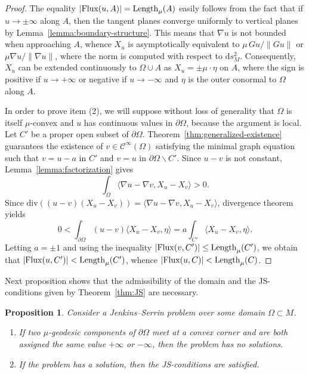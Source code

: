 \documentclass[a4paper,10pt,reqno]{amsart}
\newcommand{\df}{\mathrm{d}}
\newcommand{\Length}{\mathop{\rm Length}\nolimits}
\newcommand{\Flux}{\mathrm{Flux}}
\newtheorem{proposition}[theorem]{Proposition}
\theoremstyle{definition}
\theoremstyle{remark}
\numberwithin{equation}{section}
\begin{document}
\begin{proof}
The equality $|\Flux(u,A)|=\Length_\mu(A)$ easily follows from the fact that if $u\to\pm\infty$ along $A$, then the tangent planes converge uniformly to vertical planes by Lemma~\ref{lemma:boundary-structure}. This means that $\nabla u$ is not bounded when approaching $A$, whence $X_u$ is asymptotically equivalent to $\mu\, Gu/\|Gu\|$ or $\mu\nabla u/\|\nabla u\|$, where the norm is computed with respect to $\df s_M^2$. Consequently, $X_u$ can be extended continuously to $\Omega\cup A$ as $X_u=\pm\mu\cdot\eta$ on $A$, where the sign is positive if $u\to+\infty$ or negative if $u\to-\infty$ and $\eta$ is the outer conormal to $\Omega$ along $A$.
	
In order to prove item (2), we will suppose without loss of generality that $\Omega$ is itself $\mu$-convex and $u$ has continuous values in $\partial\Omega$, because the argument is local. Let $C'$ be a proper open subset of $\partial\Omega$. Theorem~\ref{thm:generalized-existence} guarantees the existence of $v\in\mathcal{C}^\infty(\Omega)$ satisfying the minimal graph equation such that $v=u-a$ in $C'$ and $v=u$ in $\partial\Omega\smallsetminus C'$. Since $u-v$ is not constant, Lemma~\ref{lemma:factorization} gives
	\[\int_\Omega\langle\nabla u-\nabla v,X_u-X_v\rangle>0.\]
	Since $\mathrm{div}\left((u-v)(X_u-X_v)\right)=\langle\nabla u-\nabla v,X_u-X_v\rangle$, divergence theorem yields
	\[0<\int_{\partial\Omega}(u-v)\langle X_u-X_v,\eta\rangle=a\int_{C'}\langle X_u-X_v,\eta\rangle.\]
	Letting $a=\pm 1$ and using the inequality $|\Flux(v,C')|\leq\Length_\mu(C')$, we obtain that $|\Flux(u,C')|<\Length_\mu(C')$, whence $|\Flux(u,C)|<\Length_\mu(C)$.
\end{proof}

Next proposition shows that the admissibility of the domain and the JS-conditions given by Theorem~\ref{thm:JS} are necessary.

\begin{proposition}\label{prop:admissibility}
Consider a Jenkins--Serrin problem over some domain $\Omega\subset M$.
\begin{enumerate}[label=\emph{(\arabic*)}]
 	\item If two $\mu$-geodesic components of $\partial\Omega$ meet at a convex corner and are both assigned the same value $+\infty$ or $-\infty$, then the problem has no solutions.
 	\item If the problem has a solution, then the JS-conditions are satisfied.
 \end{enumerate}
\end{proposition}
\end{document}
